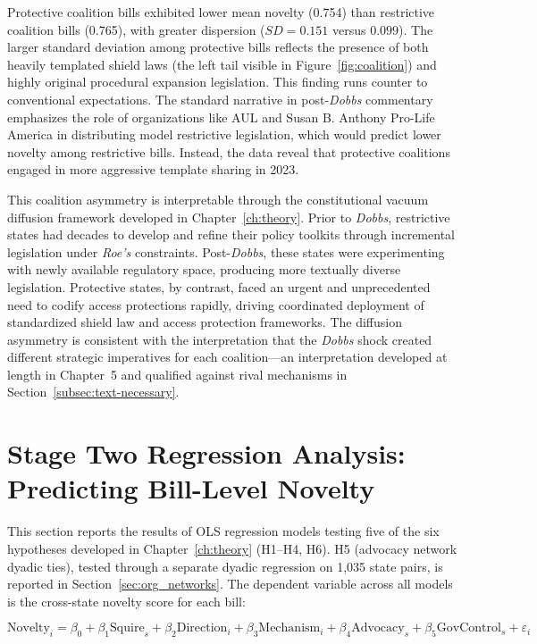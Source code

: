 Protective coalition bills exhibited lower mean novelty (0.754) than restrictive coalition bills (0.765), with greater dispersion ($SD = 0.151$ versus $0.099$). The larger standard deviation among protective bills reflects the presence of both heavily templated shield laws (the left tail visible in Figure~\ref{fig:coalition}) and highly original procedural expansion legislation. This finding runs counter to conventional expectations. The standard narrative in post-\emph{Dobbs} commentary emphasizes the role of organizations like AUL and Susan B. Anthony Pro-Life America in distributing model restrictive legislation, which would predict lower novelty among restrictive bills. Instead, the data reveal that protective coalitions engaged in more aggressive template sharing in 2023.

This coalition asymmetry is interpretable through the constitutional vacuum diffusion framework developed in Chapter~\ref{ch:theory}. Prior to \emph{Dobbs}, restrictive states had decades to develop and refine their policy toolkits through incremental legislation under \emph{Roe's} constraints. Post-\emph{Dobbs}, these states were experimenting with newly available regulatory space, producing more textually diverse legislation. Protective states, by contrast, faced an urgent and unprecedented need to codify access protections rapidly, driving coordinated deployment of standardized shield law and access protection frameworks. The diffusion asymmetry is consistent with the interpretation that the \textit{Dobbs} shock created different strategic imperatives for each coalition---an interpretation developed at length in Chapter~5 and qualified against rival mechanisms in Section~\ref{subsec:text-necessary}.

\section{Stage Two Regression Analysis: Predicting Bill-Level Novelty}
\label{sec:regression}

This section reports the results of OLS regression models testing five of the six hypotheses developed in Chapter~\ref{ch:theory} (H1--H4, H6). H5 (advocacy network dyadic ties), tested through a separate dyadic regression on 1,035 state pairs, is reported in Section~\ref{sec:org_networks}. The dependent variable across all models is the cross-state novelty score for each bill:

\begin{equation}
\text{Novelty}_i = \beta_0 + \beta_1 \text{Squire}_s + \beta_2 \text{Direction}_i + \beta_3 \text{Mechanism}_i + \beta_4 \text{Advocacy}_s + \beta_5 \text{GovControl}_s + \varepsilon_i
\label{eq:regression}
\end{equation}

